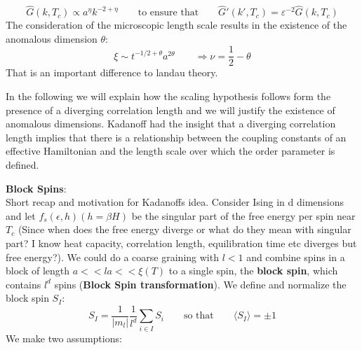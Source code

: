 	\begin{equation}
		\hat{G}(k, T_c) \propto a^\eta k^{-2 + \eta} \qquad \text{to ensure that} \qquad \hat{G}'(k', T_c) =	\varepsilon^{-2}\hat{G}(k, T_c)
	\end{equation}
	The consideration of the microscopic length scale results in the existence of the anomalous dimension $\theta$:
	\begin{equation}
		\xi \sim t^{-1/2 + \theta} a^{2 \theta} \qquad \Rightarrow \nu =	\frac{1}{2} - \theta
	\end{equation}
	That is an important difference to landau theory.
	
	In the following we will explain how the scaling hypothesis follows form the presence of a diverging correlation length and we will justify the existence of anomalous dimensions. Kadanoff had the insight that a diverging correlation length implies that there is a relationship between the coupling constants of an effective Hamiltonian and the length scale over which the order parameter is defined.
	
	\textbf{Block Spins}: \\
	Short recap and motivation for Kadanoffs idea. Consider Ising in d dimensions and let $f_s(\epsilon, h) (h = \beta H)$ be the singular part of the free energy per spin near $T_c$ (Since when does the free energy diverge or what do they mean with singular part? I	know heat capacity, correlation length, equilibration time etc diverges but free energy?). We could do a coarse graining with $l<1$ and combine spins in a block of length $a << la << \xi(T)$ to a single spin, the \textbf{block spin}, which contains $l^d$ spins (\textbf{Block Spin transformation}). We define and normalize the block spin $S_I$:
	\begin{equation}
		S_I =	\frac{1}{|m_l|} \frac{1}{l^d} \sum_{i \in I}^{} S_i \qquad \text{so that} \qquad \langle S_I \rangle = \pm 1
	\end{equation}
	We make two assumptions:
	
